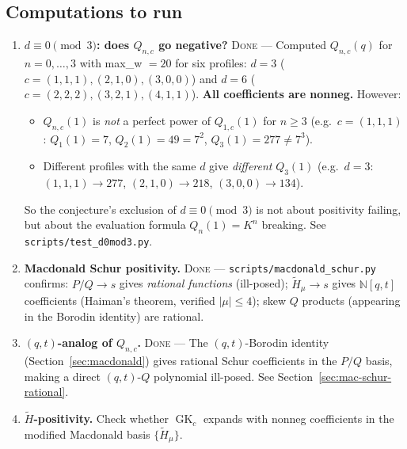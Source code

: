 \documentclass[11pt]{article}
\theoremstyle{plain}
\theoremstyle{definition}
\theoremstyle{remark}
\newcommand{\N}{\mathbb{N}}
\newcommand{\GK}{\operatorname{GK}}
\begin{document}
\subsection*{Computations to run}
\begin{enumerate}
\item \textbf{$d \equiv 0 \pmod 3$: does $Q_{n,c}$ go negative?}
  \textsc{Done} --- Computed $Q_{n,c}(q)$ for $n = 0,\ldots,3$
  with max\_w $= 20$ for six profiles:
  $d = 3$ ($c = (1,1,1), (2,1,0), (3,0,0)$) and
  $d = 6$ ($c = (2,2,2), (3,2,1), (4,1,1)$).
  \textbf{All coefficients are nonneg.}  However:
  \begin{itemize}
  \item $Q_{n,c}(1)$ is \emph{not} a perfect power of
    $Q_{1,c}(1)$ for $n \geq 3$ (e.g.\ $c = (1,1,1)$:
    $Q_1(1) = 7$, $Q_2(1) = 49 = 7^2$, $Q_3(1) = 277 \neq 7^3$).
  \item Different profiles with the same $d$ give
    \emph{different} $Q_3(1)$
    (e.g.\ $d=3$: $(1,1,1) \to 277$, $(2,1,0) \to 218$,
    $(3,0,0) \to 134$).
  \end{itemize}
  So the conjecture's exclusion of $d \equiv 0 \pmod 3$ is
  not about positivity failing, but about the evaluation
  formula $Q_n(1) = K^n$ breaking.
  See \texttt{scripts/test\_d0mod3.py}.

\item \textbf{Macdonald Schur positivity.}
  \textsc{Done} --- \texttt{scripts/macdonald\_schur.py}
  confirms: $P/Q \to s$ gives \emph{rational functions}
  (ill-posed); $\tilde{H}_\mu \to s$ gives $\N[q,t]$
  coefficients (Haiman's theorem, verified $|\mu| \leq 4$);
  skew $Q$ products (appearing in the Borodin identity)
  are rational.

\item \textbf{$(q,t)$-analog of $Q_{n,c}$.}
  \textsc{Done} --- The $(q,t)$-Borodin identity
  (Section~\ref{sec:macdonald}) gives rational Schur
  coefficients in the $P/Q$ basis, making a direct
  $(q,t)$-$Q$ polynomial ill-posed. See
  Section~\ref{sec:mac-schur-rational}.

\item \textbf{$\tilde{H}$-positivity.}
  Check whether $\GK_c$ expands with nonneg coefficients in the
  modified Macdonald basis $\{\tilde{H}_\mu\}$.
\end{enumerate}
\end{document}
